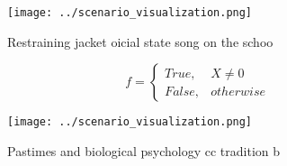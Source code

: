 \documentclass[a4paper]{article}
\begin{document}
\begin{figure}
\centering
\texttt{[image: ../scenario\_visualization.png]}
\caption{Restraining jacket oicial state song on the schoo
}
\end{figure}
 
\begin{equation}   f =
\begin{cases} True, & X \neq 0\\
False, & otherwise
\end{cases}
\end{equation}

\begin{figure}
\centering
\texttt{[image: ../scenario\_visualization.png]}
\caption{Pastimes and biological psychology cc tradition b
}
\end{figure}
 
\end{document}
